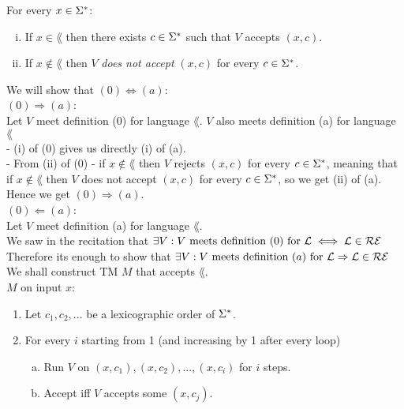 For every $x \in \Sigma^*$:
\begin{enumerate}[(i)]
    \item If $x \in \lang$ then there exists $c \in \Sigma^*$ such that $V$ accepts $(x, c)$.
    \item If $x \notin \lang$ then $V$ \textit{does not accept} $(x, c)$ for every $c \in \Sigma^*$.
\end{enumerate}

We will show that $(0) \iff (a)$: \\

\underline{$(0) \Rightarrow (a)$}: \\
Let $V$ meet definition (0) for language $\lang$. $V$ also meets definition (a) for language $\lang$ \\
- (i) of (0) gives us directly (i) of (a). \\
- From (ii) of (0) - if $x \notin \lang$ then $V$ rejects $(x, c)$ for every $c \in \Sigma^*$,
meaning that if $x \notin \lang$ then $V$ does not accept $(x, c)$ for every $c \in \Sigma^*$,
so we get (ii) of (a). \\
Hence we get $(0) \Rightarrow (a)$. \\

\underline{$(0) \Leftarrow (a)$}: \\
Let $V$ meet definition (a) for language $\lang$. \\
We saw in the recitation that $\exists V: V \text{ meets definition } (0) \text{ for } \mathcal{L} \iff \mathcal{L} \in \mathcal{R}\mathcal{E}$ \\
Therefore its enough to show that $\exists V: V \text{ meets definition } (a) \text{ for } \mathcal{L} \Rightarrow \mathcal{L} \in \mathcal{R}\mathcal{E}$ \\
We shall construct TM $M$ that accepts $\lang$. \\
$M$ on input $x$:
\begin{enumerate}[1., itemsep=5pt]

    \item Let $c_1, c_2, ...$ be a lexicographic order of $\Sigma^*$.

    \item For every $i$ starting from 1 (and increasing by 1 after every loop)

          \begin{enumerate}[a., itemsep=5pt]
              \item \qquad Run $V$ on $(x, c_1), (x, c_2), ..., (x, c_i)$ for $i$ steps.

              \item \qquad Accept iff $V$ accepts some $(x, c_j)$.
          \end{enumerate}

\end{enumerate}

